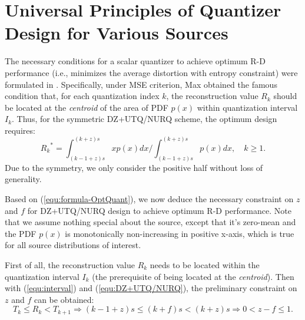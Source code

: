 \documentclass[smallabstract,smallcaptions]{dccpaper}
\begin{document}
\section{Universal Principles of Quantizer Design for Various Sources}
\label{sec:principle}

The necessary conditions for a scalar quantizer to achieve optimum R-D performance (i.e., minimizes the average distortion with entropy constraint) were formulated in \cite{Farvardin_TIT1984}. Specifically, under MSE criterion, Max \cite{Max_TIT1960} obtained the famous condition that, for each quantization index $k$, the reconstruction value $R_k$ should be located at the \emph{centroid} of the area of PDF $p(x)$ within quantization interval $I_k$. Thus, for the symmetric DZ+UTQ/NURQ scheme, the optimum design requires:
\begin{equation}\label{equ:formula-OptQuant}
	{R_k}^* = \int_{(k-1+z)s}^{(k+z)s} xp(x)dx / \int_{(k-1+z)s}^{(k+z)s} p(x)dx, \quad k \ge 1.
\end{equation}
Due to the symmetry, we only consider the positive half without loss of generality.

Based on (\ref{equ:formula-OptQuant}), we now deduce the necessary constraint on $z$ and $f$ for DZ+UTQ/NURQ design to achieve optimum R-D performance. Note that we assume nothing special about the source, except that it's zero-mean and the PDF $p(x)$ is monotonically non-increasing in positive x-axis, which is true for all source distributions of interest.

First of all, the reconstruction value $R_k$ needs to be located within the quantization interval $I_k$ (the prerequisite of being located at the \emph{centroid}). Then with (\ref{equ:interval}) and (\ref{equ:DZ+UTQ/NURQ}), the preliminary constraint on $z$ and $f$ can be obtained:
\begin{equation}\label{equ:formula-PreConstraint}
	 T_k \le R_k < T_{k+1} \Rightarrow (k-1+z)s \le (k+f)s < (k+z)s \Rightarrow 0 < z - f \le1.
\end{equation}
\end{document}
